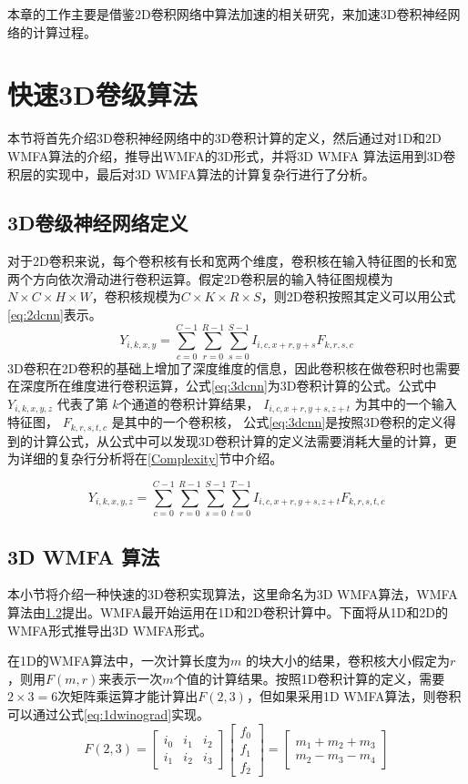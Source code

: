 本章的工作主要是借鉴2D卷积网络中算法加速的相关研究，来加速3D卷积神经网络的计算过程。
\section{快速3D卷级算法}
本节将首先介绍3D卷积神经网络中的3D卷积计算的定义，然后通过对1D和2D WMFA算法的介绍，推导出WMFA的3D形式，并将3D WMFA 算法运用到3D卷积层的实现中，最后对3D WMFA算法的计算复杂行进行了分析。

\subsection{3D卷级神经网络定义}
对于2D卷积来说，每个卷积核有长和宽两个维度，卷积核在输入特征图的长和宽两个方向依次滑动进行卷积运算。假定2D卷积层的输入特征图规模为$N\times C\times H\times W$，卷积核规模为$C\times K\times R\times S$，则2D卷积按照其定义可以用公式\ref{eq:2dcnn}表示。
\begin{equation} \label{eq:2dcnn}
Y_{i,k,x,y} = \sum_{c=0}^{C-1}\sum_{r=0}^{R-1}\sum_{s=0}^{S-1}I_{i,c,x+r,y+s}F_{k,r,s,c}
\end{equation} 
3D卷积在2D卷积的基础上增加了深度维度的信息，因此卷积核在做卷积时也需要在深度所在维度进行卷积运算，公式\ref{eq:3dcnn}为3D卷积计算的公式。公式中 $Y_{i,k,x,y,z}$ 代表了第 $k$个通道的卷积计算结果， $I_{i,c,x+r,y+s,z+t}$ 为其中的一个输入特征图， $F_{k,r,s,t,c}$ 是其中的一个卷积核， 公式\ref{eq:3dcnn}是按照3D卷积的定义得到的计算公式，从公式中可以发现3D卷积计算的定义法需要消耗大量的计算，更为详细的复杂行分析将在\ref{Complexity}节中介绍。 

\begin{equation} \label{eq:3dcnn}
Y_{i,k,x,y,z} = \sum_{c=0}^{C-1}\sum_{r=0}^{R-1}\sum_{s=0}^{S-1}\sum_{t=0}^{T-1}I_{i,c,x+r,y+s,z+t}F_{k,r,s,t,c}
\end{equation} 

\subsection{3D WMFA 算法}
本小节将介绍一种快速的3D卷积实现算法，这里命名为3D WMFA算法，WMFA算法由\ref{}提出。WMFA最开始运用在1D和2D卷积计算中。下面将从1D和2D的WMFA形式推导出3D WMFA形式。

在1D的WMFA算法中，一次计算长度为$m$ 的块大小的结果，卷积核大小假定为$r$，则用$F(m,r)$来表示一次$m$个值的计算结果。按照1D卷积计算的定义，需要$2\times 3=6$次矩阵乘运算才能计算出$F(2,3)$，但如果采用1D WMFA算法，则卷积可以通过公式\ref{eq:1dwinograd}实现。
\begin{equation} \label{eq:1dwinograd}
F(2,3) = \begin{bmatrix}
i_0 & i_1 & i_2 \\
i_1 & i_2 & i_3 
\end{bmatrix}
\begin{bmatrix}
f_0 \\
f_1 \\
f_2
\end{bmatrix}
= \begin{bmatrix}
m_1 + m_2 + m_3 \\
m_2 - m_3 - m_4
\end{bmatrix}
\end{equation} 

